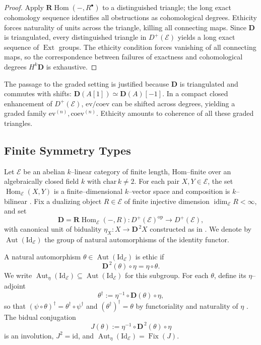 \documentclass[12pt]{article}
\DeclareMathOperator{\Aut}{Aut}
\DeclareMathOperator{\Fix}{Fix}
\newcommand{\Id}{\mathrm{Id}}
\newcommand{\idim}{\operatorname{idim}}
\newcommand{\E}{\mathcal{E}}
\newcommand{\Hom}{\operatorname{Hom}}
\newcommand{\Ext}{\operatorname{Ext}}
\newcommand{\id}{\mathrm{id}}
\newcommand{\op}{\mathrm{op}}
\newcommand{\RHom}{\mathbf{R}\!\operatorname{Hom}}
\newcommand{\Dplus}{D^{+}}
\newcommand{\coev}{\mathrm{coev}}
\newcommand{\ev}{\mathrm{ev}}
\theoremstyle{plain}
\theoremstyle{definition}
\theoremstyle{remark}
\numberwithin{equation}{section}
\begin{document}
\begin{proof}
Apply \(\RHom(-,R^\bullet)\) to a distinguished triangle; the long exact cohomology sequence identifies all obstructions as cohomological degrees. Ethicity forces naturality of units across the triangle, killing all connecting maps. Since $\mathbf D$ is triangulated, every distinguished triangle
in $D^+(\E)$ yields a long exact sequence of $\Ext$ groups.
The ethicity condition forces vanishing of all connecting maps,
so the correspondence between failures of exactness and
cohomological degrees $H^k\mathbf D$ is exhaustive.
\end{proof}

The passage to the graded setting is justified because
$\mathbf D$ is triangulated and commutes with shifts:
$\mathbf D(A[1])\simeq\mathbf D(A)[-1]$. In a compact closed enhancement of \(\Dplus(\E)\), \(\ev/\coev\) can be shifted across degrees, yielding a graded family \(\ev^{(n)},\coev^{(n)}\). Ethicity amounts to coherence of all these graded triangles.

\subsection{Finite Symmetry Types}

Let $\E$ be an abelian $k$–linear category of finite length, Hom–finite over an algebraically closed field $k$ with $\mathrm{char}\,k\neq2$.  
For each pair $X,Y\in\E$, the set $\Hom_\E(X,Y)$ is a finite–dimensional $k$–vector space and composition is $k$–bilinear \cite{MacLane1998}.  
Fix a dualizing object $R\in\E$ of finite injective dimension $\idim_\E R<\infty$, and set
\[
\mathbf D=\RHom_\E(-,R)\colon \Dplus(\E)^{\op}\to \Dplus(\E),
\]
with canonical unit of biduality $\eta_X\colon X\to \mathbf D^{\,2}X$ constructed as in \cite{Weibel1994}.  
We denote by $\Aut(\Id_\E)$ the group of natural automorphisms of the identity functor.

A natural automorphism $\theta\in\Aut(\Id_\E)$ is ethic if
\[
\mathbf D^{\,2}(\theta)\circ\eta=\eta\circ\theta.
\]
We write $\Aut_\eta(\Id_\E)\subseteq\Aut(\Id_\E)$ for this subgroup.  
For each $\theta$, define its $\eta$–adjoint
\[
\theta^{\dagger}:=\eta^{-1}\circ\mathbf D(\theta)\circ\eta,
\]
so that $(\psi\!\circ\!\theta)^{\dagger}=\theta^{\dagger}\!\circ\!\psi^{\dagger}$ and $(\theta^{\dagger})^{\dagger}=\theta$ by functoriality and naturality of $\eta$ \cite{MacLane1998}.  
The bidual conjugation
\[
J(\theta):=\eta^{-1}\circ\mathbf D^{\,2}(\theta)\circ\eta
\]
is an involution, $J^2=\id$, and $\Aut_\eta(\Id_\E)=\Fix(J)$.
\end{document}
